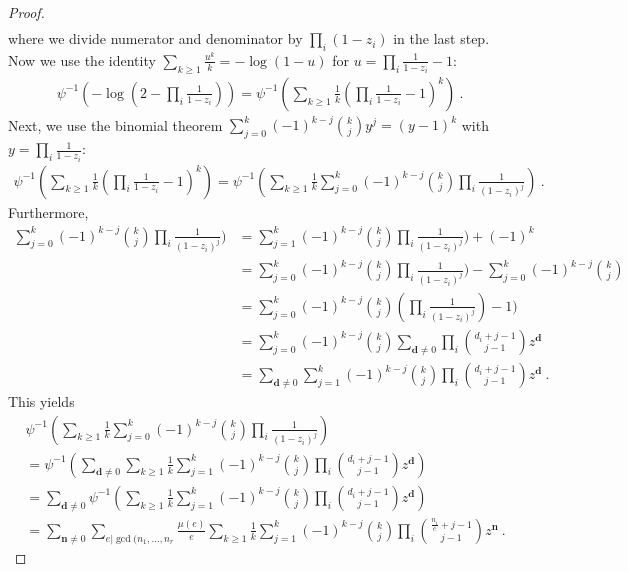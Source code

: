 \documentclass{article}
\newcommand{\bd}{\mathbf{d}}
\newcommand{\bn}{\mathbf{n}}
\begin{document}
\begin{proof}
\begin{align*}
\end{align*}
where we divide numerator and denominator by $\prod_i (1-z_i)$ in the last step.
Now we use the identity $\sum_{k \geq 1} \frac{u^k}{k} = -\log (1-u)$ for $u= \prod_i \frac{1}{1 - z_i} -1$:
\begin{align*}
    \psi^{-1} (- \log (2- \prod_i \frac{1}{1-z_i})) = \psi^{-1} (\sum_{k \geq 1} \frac{1}{k} (\prod_i \frac{1}{1 - z_i} -1)^k) ~.
\end{align*}
Next, we use the binomial theorem $\sum^k_{j=0} (-1)^{k-j} \binom{k}{j} y^j = (y-1)^k$ with $y=\prod_i \frac{1}{1 - z_i}$:
\begin{align*}
     \psi^{-1} (\sum_{k \geq 1} \frac{1}{k} (\prod_i \frac{1}{1 - z_i} -1)^k)  = \psi^{-1}(\sum_{k \geq 1} \frac{1}{k} \sum^k_{j=0} (-1)^{k-j} \binom{k}{j} \prod_i \frac{1}{(1 - z_i)^j}) ~.
\end{align*}
Furthermore,
\begin{align*}
    \sum^k_{j=0} (-1)^{k-j} \binom{k}{j} \prod_i \frac{1}{(1 - z_i)^j}) &=  \sum^k_{j=1} (-1)^{k-j} \binom{k}{j} \prod_i \frac{1}{(1 - z_i)^j}) + (-1)^k \\
    &= \sum^k_{j=0} (-1)^{k-j} \binom{k}{j} \prod_i \frac{1}{(1 - z_i)^j}) - \sum_{j=0}^k (-1)^{k-j} \binom{k}{j} \\
    &= \sum^k_{j=0} (-1)^{k-j} \binom{k}{j} (\prod_i \frac{1}{(1 - z_i)^j})-1) \\
    &= \sum^k_{j=0} (-1)^{k-j} \binom{k}{j} \sum_{ \bd \neq 0} \prod_i \binom{d_i+j-1}{j-1} z^{\bd}\\
    &= \sum_{\bd \neq 0} \sum^k_{j=1} (-1)^{k-j} \binom{k}{j} \prod_i \binom{d_i +j -1}{j-1} z^{\bd}  ~.
\end{align*}
This yields
\begin{align*}
   & \psi^{-1}(\sum_{k \geq 1} \frac{1}{k} \sum^k_{j=0} (-1)^{k-j} \binom{k}{j} \prod_i \frac{1}{(1 - z_i)^j}) \\
    &= \psi^{-1}(\sum_{\bd\neq 0}\sum_{k \geq 1} \frac{1}{k} \sum^k_{j=1} (-1)^{k-j} \binom{k}{j} \prod_i \binom{d_i+j-1}{j-1} z^{\bd})\\
    &= \sum_{\bd \neq 0} \psi^{-1}(\sum_{k \geq 1} \frac{1}{k} \sum^k_{j=1} (-1)^{k-j} \binom{k}{j} \prod_i \binom{d_i+j-1}{j-1} z^{\bd}) \\
    &= \sum_{\bn \neq 0} \sum_{e | \gcd (n_1, \dots, n_r} \frac{\mu(e)}{e} \sum_{k \geq 1} \frac{1}{k} \sum^k_{j=1} (-1)^{k-j} \binom{k}{j} \prod_i \binom{\frac{n_i}{e}+j-1}{j-1} z^{\bn} ~.
\end{align*}

 \end{proof}
\end{document}
